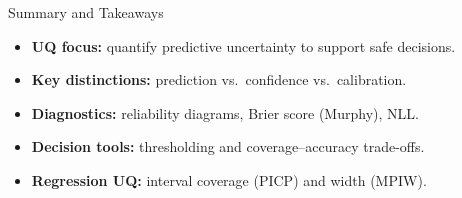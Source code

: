 \documentclass[aspectratio=169]{beamer}
\begin{document}
\begin{frame}{Summary and Takeaways}
  \begin{itemize}
    \item \textbf{UQ focus:} quantify predictive uncertainty to support safe decisions.
    \item \textbf{Key distinctions:} prediction vs.\ confidence vs.\ calibration.
    \item \textbf{Diagnostics:} reliability diagrams, Brier score (Murphy), NLL.
    \item \textbf{Decision tools:} thresholding and coverage--accuracy trade-offs.
    \item \textbf{Regression UQ:} interval coverage (PICP) and width (MPIW).
  \end{itemize}
\end{frame}
\end{document}
